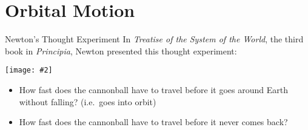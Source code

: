 \documentclass[12pt,compress,aspectratio=169]{beamer}
\newcommand{\pic}[2]{\texttt{[image: \#2]}}
\newcommand{\mb}[1]{\ensuremath\mathbf{#1}}
\newcommand{\eq}[2]{\vspace{#1}{\Large\begin{displaymath}#2\end{displaymath}}}
\begin{document}
%
%



\section{Orbital Motion}


\begin{frame}{Newton's Thought Experiment}
  In \emph{Treatise of the System of the World}, the third book in
  \emph{Principia}, Newton presented this thought experiment:
  \begin{center}
    \pic{.8}{figure-5.png}
  \end{center}
  \begin{itemize}
  \item How fast does the cannonball have to travel before it goes around Earth
    without falling? (i.e.\ goes into orbit)
  \item How fast does the cannonball have to travel before it never comes back?
  \end{itemize}
\end{frame}
\end{document}
